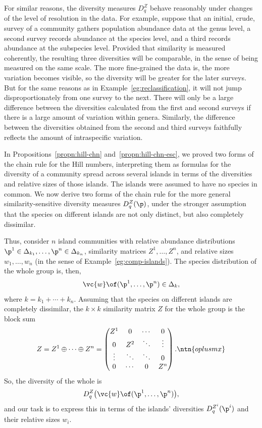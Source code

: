 For similar reasons, the diversity measures $D_q^Z$ behave reasonably under
changes of the level of resolution in the data.  For
example, suppose that an initial, crude, survey of a community gathers
population abundance data at the genus level, a second survey records
abundance at the species level, and a third records abundance at the
subspecies level.  Provided that similarity is measured coherently, the
resulting three diversities will be comparable, in the sense of being
measured on the same scale.  The more fine-grained the data is, the more
variation becomes visible, so the diversity will be greater for the later
surveys.  But for the same reasons as in Example~\ref{eg:reclassification},
it will not jump disproportionately from one survey to the next.  There
will only be a large difference between the diversities calculated from the
first and second surveys if there is a large amount of variation within
genera.  Similarly, the difference between the diversities obtained from
the second and third surveys faithfully reflects the amount of
intraspecific variation.

In Propositions~\ref{propn:hill-chn} and~\ref{propn:hill-chn-esc}, we
proved two forms of the chain rule for the Hill numbers, interpreting them
as formulas for the diversity of a community spread across several
islands%
%
%  
in terms of the diversities and relative sizes of those islands.  The
islands were assumed to have no species in common.  We now
derive two forms of the chain rule for the more general
similarity-sensitive diversity measures $D_q^Z(\p)$, under the stronger
assumption that the species on different islands are not only distinct, but
also completely dissimilar.

Thus, consider $n$ island communities with relative abundance
distributions $\p^1 \in \Delta_{k_1}, \ldots, \p^n \in \Delta_{k_n}$,
similarity matrices $Z^1, \ldots, Z^n$, and relative sizes $w_1, \ldots,
w_n$ (in the sense of Example~\ref{eg:comp-islands}).  The species
distribution of the whole group is, then,
\[
\vc{w} \of (\p^1, \ldots, \p^n) 
\in 
\Delta_k,
\]
where $k = k_1 + \cdots + k_n$.  Assuming that the species on different
islands are completely dissimilar, the $k \times k$ similarity matrix $Z$
for the whole group is the block sum
\[
Z
=
Z^1 \oplus \cdots \oplus Z^n
=
\begin{pmatrix}
Z^1     &0      &\cdots &0      \\
0       &Z^2    &\ddots &\vdots \\
\vdots  &\ddots &\ddots &0      \\
0       &\cdots &0      &Z^n
\end{pmatrix}.
\ntn{oplusmx}
\]
So, the diversity of the whole is
\[
D_q^Z\bigl( \vc{w} \of (\p^1, \ldots, \p^n) \bigr),
\]
and our task is to express this in terms of the islands' diversities
$D_q^{Z^i}(\p^i)$ and their relative sizes $w_i$.

